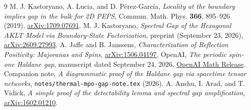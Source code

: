 \documentclass[11pt]{article}
\begin{document}
\begin{thebibliography}{9}
	\setlength{\itemsep}{2pt plus 1pt}
	\setlength{\parskip}{0pt}
	M. J. Kastoryano, A. Lucia, and D. P\'erez-Garc\'ia,
	\emph{Locality at the boundary implies gap in the bulk for 2D PEPS},
	Commun. Math. Phys. \textbf{366}, 895--926 (2019),
	\href{https://arxiv.org/abs/1709.07691}{arXiv:1709.07691}.
	M. J. Kastoryano,
	\emph{Spectral Gap of the Hexagonal AKLT Model via Boundary-State
		Factorization}, preprint (September 23, 2026),
	\href{https://arxiv.org/abs/2609.27993}{arXiv:2609.27993}.
	A. Jaffe and B. Janssens,
	\emph{Characterization of Reflection Positivity: Majoranas and Spins},
	\href{https://arxiv.org/abs/1506.04197}{arXiv:1506.04197}.
	OpenAI, \emph{The periodic spin-one Haldane gap},
	manuscript dated September 24, 2026,
	\href{https://github.com/openai/math/blob/main/preprints/The-periodic-spin-one-Haldane-gap-September-24-2026/paper.pdf}{OpenAI Math Release}.
	Companion note, \emph{A diagrammatic proof of the Haldane gap via spacetime
		tensor networks}, \texttt{notes/thermal-mpo-gap-note.tex} (2026).
	A. Anshu, I. Arad, and T. Vidick,
	\emph{A simple proof of the detectability lemma and spectral gap amplification},
	\href{https://arxiv.org/abs/1602.01210}{arXiv:1602.01210}.
\end{thebibliography}
\end{document}
